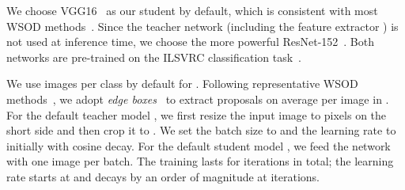  We choose VGG16~\cite{vgg} as our student  by default, which is consistent with most WSOD methods~\cite{wsddn,tang2017cvpr,tang2018eccv,shen2019cvpr,tang2018pami}.
{Since the teacher network  (including the feature extractor )} is not used at inference time, we choose the more powerful ResNet-152~\cite{resnet}.
Both networks are pre-trained on the ILSVRC classification task~\cite{RDS+14}.

 We use  images per class by default for . Following representative WSOD methods~\cite{wsddn,tang2017cvpr,tang2018pami,zhang2018cvpr}, we adopt \emph{edge boxes}~\cite{edgeboxes} to extract  proposals on average per image in . For the default teacher model , we first resize the input image to  pixels on the short side and then crop it to . We set the batch size to  and the learning rate to  initially with cosine decay. For the default student model , we feed the network with one image per batch. The training lasts for  iterations in total; the learning rate starts at  and decays by an order of magnitude at  iterations.

